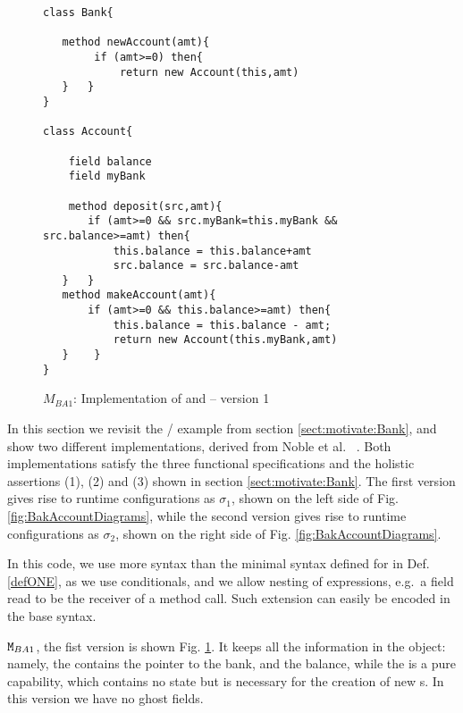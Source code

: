 \begin{figure}[thb]
\begin{lstlisting}
class Bank{

   method newAccount(amt){
        if (amt>=0) then{
            return new Account(this,amt)
   }   }
}

class Account{

    field balance
    field myBank
    
    method deposit(src,amt){
       if (amt>=0 && src.myBank=this.myBank && src.balance>=amt) then{
           this.balance = this.balance+amt
           src.balance = src.balance-amt
   }   }
   method makeAccount(amt){
       if (amt>=0 && this.balance>=amt) then{
           this.balance = this.balance - amt;
           return new Account(this.myBank,amt)
   }    }
}
\end{lstlisting}
 \vspace*{-7mm}
\caption{$M_{BA1}$: Implementation of  and  -- version 1}
\label{fig:BanAccImplV1}
\end{figure}

In this section we revisit the / example from
 section  \ref{sect:motivate:Bank}, and show two different
 implementations, derived from Noble et al.\ \cite{arnd18} . Both implementations  satisfy the three functional specifications and the holistic assertions
 (1), (2) and (3)  shown in section \ref{sect:motivate:Bank}.
 The first version gives rise to runtime configurations as $\sigma_1$, 
 shown on the left side of Fig. \ref{fig:BakAccountDiagrams}, while the
 second version gives rise to runtime configurations as $\sigma_2$,
 shown on the right side of Fig. \ref{fig:BakAccountDiagrams}. 

 In this code, we use more syntax than the minimal syntax defined for \LangOO in Def. \ref{defONE}, as we use conditionals, and we allow nesting of expressions, e.g.\ a field read to be the receiver of a method call. Such extension can easily be encoded in the base syntax.

${\mbox{\tt{\ensuremath{{\mbox{\tt{M}}}}}}}_{BA1}$, the fist version is shown Fig. \ref{fig:BanAccImplV1}. It keeps all the information in the  object: namely,
the  contains the pointer to the bank, and the balance, while the  is a pure capability, which contains
no state but is necessary for the creation of new s.
In this version we have no ghost fields.

